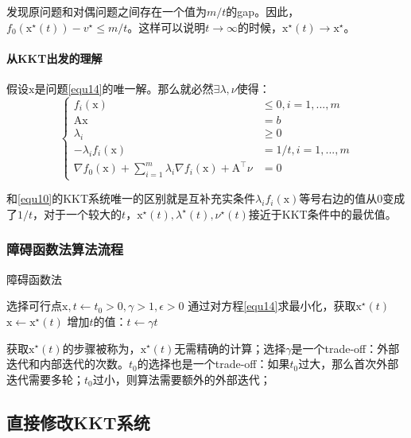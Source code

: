 \documentclass[a4paper]{D:/MyRepo/Script/latex/PaperReadingLog}
\begin{document}
发现原问题和对偶问题之间存在一个值为$m/t$的gap。因此，$f_0(\mathrm{x}^\star(t))-v^\star\le m/t$。这样可以说明$t\rightarrow\infty$的时候，$\mathrm{x}^\star(t)\rightarrow\mathrm{x}^\star$。

\paragraph{从KKT出发的理解}
假设$\mathrm{x}$是问题\ref{equ14}的唯一解。那么就必然$\exists \lambda,\nu$使得：
\begin{equation}
    \label{equ17}
    \left\{
    \begin{aligned}
        f_i(\mathrm{x})& \le0,i=1,...,m\\
        \mathrm{A}\mathrm{x}&=b\\
        \lambda_i&\ge0\\
        -\lambda_i f_i(\mathrm{x})&=1/t,i=1,...,m\\
        \nabla f_0(\mathrm{x})+\sum_{i=1}^m\lambda_i \nabla f_i(\mathrm{x})+\mathrm{A}^\top\nu&=0
    \end{aligned}
    \right.
\end{equation}

和\ref{equ10}的KKT系统唯一的区别就是互补充实条件$\lambda_if_i(\mathrm{x})$等号右边的值从0变成了$1/t$，对于一个较大的$t$，$\mathrm{x}^\star(t),\lambda^\star(t),\nu^\star(t)$接近于KKT条件中的最优值。


\subsubsection{障碍函数法算法流程}
\begin{algorithm}
	\caption{障碍函数法} 
	\begin{algorithmic}[1]
		\STATE 选择可行点$\mathrm{x},t\leftarrow t_0>0,\gamma>1,\epsilon>0$
        \STATE 通过对方程\ref{equ14}求最小化，获取$\mathrm{x}^\star(t)$
        \STATE $\mathrm{x}\leftarrow\mathrm{x}^\star(t)$
            \STATE {}
        \ENDIF
        \STATE 增加$t$的值：$t\leftarrow \gamma t$
        \ENDWHILE
	\end{algorithmic}
\end{algorithm}

获取$\mathrm{x}^\star(t)$的步骤被称为，$\mathrm{x}^\star(t)$无需精确的计算；选择$\gamma$是一个trade-off：外部迭代和内部迭代的次数。$t_0$的选择也是一个trade-off：如果$t_0$过大，那么首次外部迭代需要多轮；$t_0$过小，则算法需要额外的外部迭代；

\subsection{直接修改KKT系统}
\end{document}
